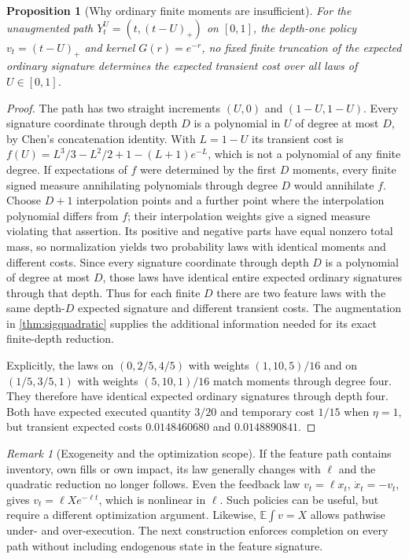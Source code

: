 \documentclass[11pt]{article}
\numberwithin{equation}{section}
\newtheorem{proposition}[theorem]{Proposition}
\theoremstyle{definition}
\theoremstyle{remark}
\newtheorem{remark}[theorem]{Remark}
\newcommand{\E}{\mathbb{E}}
\theoremstyle{definition}
\begin{document}
\begin{proposition}[Why ordinary finite moments are insufficient]\label{rem:sigcounter}
For the unaugmented path $Y_t^U=(t,(t-U)_+)$ on $[0,1]$, the depth-one
policy $v_t=(t-U)_+$ and kernel $G(r)=e^{-r}$, no fixed finite truncation
of the expected ordinary signature determines the expected transient cost
over all laws of $U\in[0,1]$.
\end{proposition}
\begin{proof}
The path has two straight increments $(U,0)$ and $(1-U,1-U)$.
Every signature coordinate through depth $D$ is a polynomial in $U$ of
degree at most $D$, by Chen's concatenation identity. With $L=1-U$ its
transient cost is
$f(U)=L^3/3-L^2/2+1-(L+1)e^{-L}$, which is not a polynomial of any finite
degree. If expectations of $f$ were determined by the first $D$ moments,
every finite signed measure annihilating polynomials through degree $D$
would annihilate $f$. Choose $D+1$ interpolation points and a further point
where the interpolation polynomial differs from $f$; their interpolation
weights give a signed measure violating that assertion. Its positive and
negative parts have equal nonzero total mass, so normalization yields two
probability laws with identical moments and different costs.
Since every signature coordinate through depth $D$ is a polynomial of
degree at most $D$, those laws have identical entire expected ordinary
signatures through that depth. Thus for each finite $D$ there are two
feature laws with the same depth-$D$ expected signature and different
transient costs. The augmentation in \cref{thm:sigquadratic} supplies the
additional information needed for its exact finite-depth reduction.

Explicitly, the laws on $(0,2/5,4/5)$ with weights $(1,10,5)/16$ and on
$(1/5,3/5,1)$ with weights $(5,10,1)/16$ match moments through degree four.
They therefore have identical expected ordinary signatures through depth
four. Both have expected executed quantity $3/20$ and temporary cost $1/15$ when
$\eta=1$, but transient expected costs $0.0148460680$ and $0.0148890841$.
\end{proof}

\begin{remark}[Exogeneity and the optimization scope]\label{rem:endogenous}
If the feature path contains inventory, own fills or own impact, its law
generally changes with $\ell$ and the quadratic reduction no longer follows.
Even the feedback law $v_t=\ell x_t$, $\dot x_t=-v_t$, gives
$v_t=\ell X e^{-\ell t}$, which is nonlinear in $\ell$. Such policies can
be useful, but require a different optimization argument. Likewise,
$\E\int v=X$ allows pathwise under- and over-execution. The next construction
enforces completion on every path without including endogenous state in the
feature signature.
\end{remark}
\end{document}
